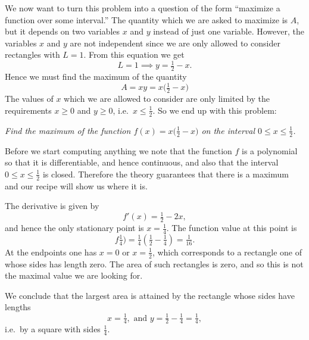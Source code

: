 We now want to turn this problem into a question of the form ``maximize a
function over some interval.''  The quantity which we are asked to maximize is
$A$, but it depends on two variables $x$ and $y$ instead of just one variable.
However, the variables $x$ and $y$ are not independent since we are only allowed
to consider rectangles with $L=1$.  From this equation we get
\[
L=1\implies y = \tfrac12-x.
\]
Hence we must find the maximum of the quantity
\[
A= xy = x\bigl(\tfrac12-x\bigr)
\]
The values of $x$ which we are allowed to consider are only limited by
the requirements $x\geq 0$ and $y\geq0$, i.e.\ $x\leq \tfrac12$.  So
we end up with this problem:
\begin{center}
  \textit{Find the maximum of the function
    $f(x)=x\bigl(\tfrac12-x\bigr)$ on the interval $0\leq x\leq
    \tfrac12$.}
\end{center}
Before we start computing anything we note that the function $f$ is a
polynomial so that it is differentiable, and hence continuous, and
also that the interval $0\leq x\leq\tfrac12$ is closed.  Therefore the
theory guarantees that there is a maximum and our recipe will show us
where it is.

The derivative is given by
\[
f'(x) = \tfrac12 - 2x,
\]
and hence the only stationary point is \( x=\tfrac14 \).  The function value at
this point is
\[
f\tfrac14) = \tfrac14(\tfrac12-\tfrac14) = \tfrac1{16}.
\]
At the endpoints one has $x=0$ or $x=\tfrac12$, which corresponds to a rectangle
one of whose sides has length zero.  The area of such rectangles is zero, and so
this is not the maximal value we are looking for.

We conclude that the largest area is attained by the rectangle whose sides have
lengths
\[
x=\tfrac14, \text{ and }y= \tfrac12-\tfrac14 = \tfrac14,
\]
i.e.\ by a square with sides $\tfrac14$.


